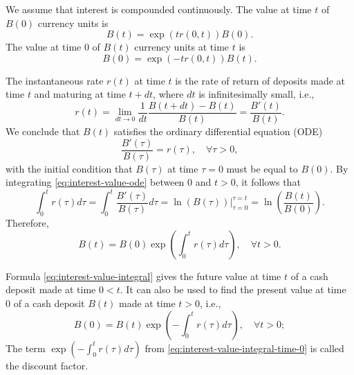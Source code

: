 We assume that interest is compounded continuously.
The value at time $ t $ of $ B(0) $ currency units is
\begin{equation}
    B(t) = \exp (t r(0, t)) B(0).
    \label{eq:interest-value-time-t}
\end{equation}
The value at time 0 of $ B(t) $ currency units at time $ t $ is
\begin{equation}
    B(0) = \exp (-t r(0, t)) B(t).
    \label{eq:interest-value-time-0}
\end{equation}

The instantaneous rate $ r(t) $ at time $ t $ is the rate of return of deposits
    made at time $ t $ and maturing at time $ t + dt $, where $ dt $ is
    infinitesimally small, i.e.,
\begin{equation*}
    r(t) = \lim_{dt \rightarrow 0} \frac{1}{dt} \frac{B(t + dt) - B(t)}{B(t)} =
        \frac{B'(t)}{B(t)}.
\end{equation*}
We conclude that $ B(t) $ satisfies the ordinary differential equation (ODE)
\begin{equation}
    \frac{B'(\tau)}{B(\tau)} = r(\tau), \quad \forall \tau > 0,
    \label{eq:interest-value-ode}
\end{equation}
with the initial condition that $ B(\tau) $ at time $ \tau = 0 $ must be equal
    to $ B(0) $.
By integrating \eqref{eq:interest-value-ode} between 0 and $ t > 0 $, it follows
    that
\begin{equation*}
    \int_{0}^{t} r(\tau) d\tau = \int_{0}^{t} \frac{B'(\tau)}{B(\tau)} d\tau =
        \ln (B(\tau)) |_{\tau=0}^{\tau=t} =
        \ln \left( \frac{B(t)}{B(0)} \right).
\end{equation*}
Therefore,
\begin{equation}
    B(t) = B(0) \exp \left( \int_{0}^{t} r(\tau) d\tau \right), \quad
        \forall t > 0.
    \label{eq:interest-value-integral}
\end{equation}

Formula \eqref{eq:interest-value-integral} gives the future value at time $ t $
    of a cash deposit made at time $ 0 < t $.
It can also be used to find the present value at time 0 of a cash deposit
    $ B(t) $ made at time $ t > 0 $, i.e.,
\begin{equation}
    B(0) = B(t) \exp \left( -\int_{0}^{t} r(\tau) d\tau \right), \quad
        \forall t > 0;
    \label{eq:interest-value-integral-time-0}
\end{equation}
The term $ \exp \left( -\int_{0}^{t} r(\tau) d\tau \right) $ from
    \eqref{eq:interest-value-integral-time-0} is called the discount factor.

